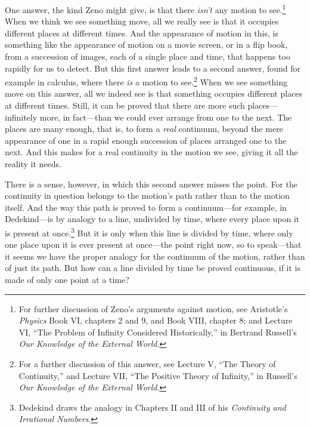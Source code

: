 \documentclass[12pt]{memoir}
\begin{document}
One answer, the kind Zeno might give, is that there \emph{isn't} any
motion to see.\footnote{For further discussion of Zeno's arguments
  against motion, see Aristotle's \emph{Physics} Book VI, chapters 2 and
  9, and Book VIII, chapter 8; and Lecture VI, ``The Problem of Infinity
  Considered Historically,'' in Bertrand Russell's \emph{Our Knowledge
  of the External World}.} When we think we see something move, all we
really see is that it occupies different places at different times. And
the appearance of motion in this, is something like the appearance of
motion on a movie screen, or in a flip book, from a succession of
images, each of a single place and time, that happens too rapidly for us
to detect. But this first answer leads to a second answer, found for
example in calculus, where there \emph{is} a motion to
see.\footnote{For a further discussion of this answer, see Lecture V,
  ``The Theory of Continuity,'' and Lecture VII, ``The Positive Theory
  of Infinity,'' in Russell's \emph{Our Knowledge of the External
  World}.} When we see something move on this answer, all we indeed see
is that something occupies different places at different times. Still,
it can be proved that there are more such places---infinitely more, in
fact---than we could ever arrange from one to the next. The places are
many enough, that is, to form a \emph{real} continuum, beyond the mere
appearance of one in a rapid enough succession of places arranged one to
the next. And this makes for a real continuity in the motion we see,
giving it all the reality it needs.

There is a sense, however, in which this second answer misses the point.
For the continuity in question belongs to the motion's path rather than
to the motion itself. And the way this path is proved to form a
continuum---for example, in Dedekind---is by analogy to a line,
undivided by time, where every place upon it is present at
once.\footnote{Dedekind draws the analogy in Chapters II and III of his
  \emph{Continuity and Irrational Numbers}.} But it is only when this
line is divided by time, where only one place upon it is ever present at
once---the point right now, so to speak---that it seems we have the
proper analogy for the continuum of the motion, rather than of just its
path. But how can a line divided by time be proved continuous, if it is
made of only one point at a time?
\end{document}

